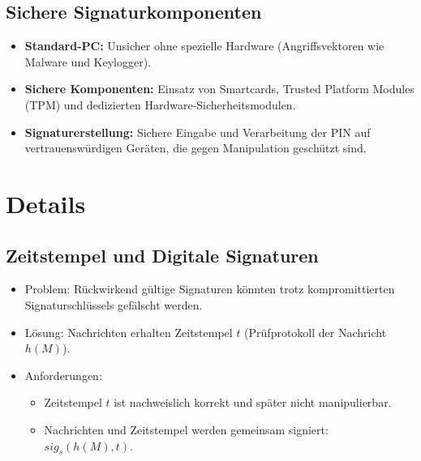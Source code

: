 \documentclass{article}
\begin{document}
\subsection{Sichere Signaturkomponenten}
\begin{itemize}
    \item \textbf{Standard-PC:} Unsicher ohne spezielle Hardware (Angriffsvektoren wie Malware und Keylogger).
    \item \textbf{Sichere Komponenten:} Einsatz von Smartcards, Trusted Platform Modules (TPM) und dedizierten Hardware-Sicherheitsmodulen.
    \item \textbf{Signaturerstellung:} Sichere Eingabe und Verarbeitung der PIN auf vertrauenswürdigen Geräten, die gegen Manipulation geschützt sind.
\end{itemize}




\section{Details}

\subsection{Zeitstempel und Digitale Signaturen}
\begin{itemize}
    \item Problem: Rückwirkend gültige Signaturen könnten trotz kompromittierten Signaturschlüssels gefälscht werden.
    \item Lösung: Nachrichten erhalten Zeitstempel $t$ (Prüfprotokoll der Nachricht $h(M)$).
    \item Anforderungen:
    \begin{itemize}
        \item Zeitstempel $t$ ist nachweislich korrekt und später nicht manipulierbar.
        \item Nachrichten und Zeitstempel werden gemeinsam signiert: $sig_s(h(M), t)$.
    \end{itemize}
\end{itemize}
\end{document}
